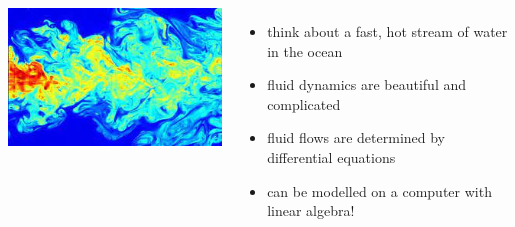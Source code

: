 \documentclass[handout]{beamer}
\begin{document}
\begin{frame}{}
 \begin{columns}
    \centering
             \includegraphics[width=1.5\linewidth,angle=90]{img/cfd.jpg}
    \begin{itemize}
      \item think about a fast, hot stream of water in the ocean
      \item fluid dynamics are beautiful and complicated
      \item fluid flows are determined by differential equations
      \item can be modelled on a computer with linear algebra!
    \end{itemize}
 \end{columns} 
\end{frame}
\end{document}
